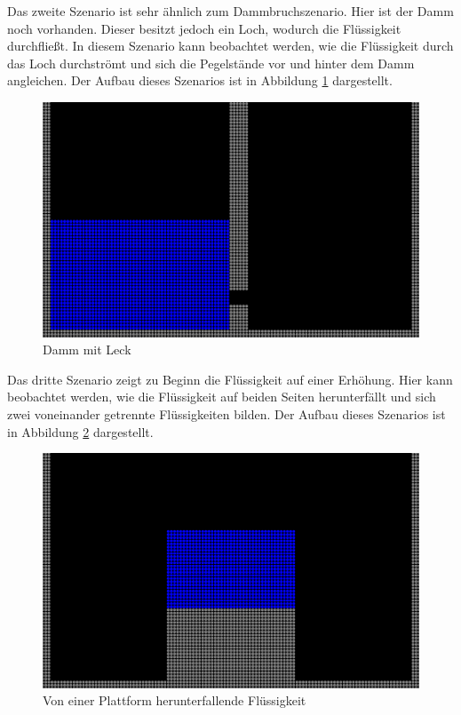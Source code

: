 \documentclass{scrreprt}
\begin{document}
Das zweite Szenario ist sehr ähnlich zum Dammbruchszenario. Hier ist der Damm noch vorhanden. Dieser besitzt jedoch ein Loch, wodurch die Flüssigkeit durchfließt.
In diesem Szenario kann beobachtet werden, wie die Flüssigkeit durch das Loch durchströmt und sich die Pegelstände vor und hinter dem Damm angleichen.
Der Aufbau dieses Szenarios ist in Abbildung \ref{image:leaking_dam} dargestellt.
\begin{figure}[htb]
    \includegraphics[width=\textwidth]{Dammleck.png}
    \caption{Damm mit Leck}
    \label{image:leaking_dam}
\end{figure}

Das dritte Szenario zeigt zu Beginn die Flüssigkeit auf einer Erhöhung.
Hier kann beobachtet werden, wie die Flüssigkeit auf beiden Seiten herunterfällt und sich zwei voneinander getrennte Flüssigkeiten bilden.
Der Aufbau dieses Szenarios ist in Abbildung \ref{image:falling_fluid} dargestellt.
\begin{figure}[htb]
    \includegraphics[width=\textwidth]{Fallend.png}
    \caption{Von einer Plattform herunterfallende Flüssigkeit}
    \label{image:falling_fluid}
\end{figure}
\end{document}
